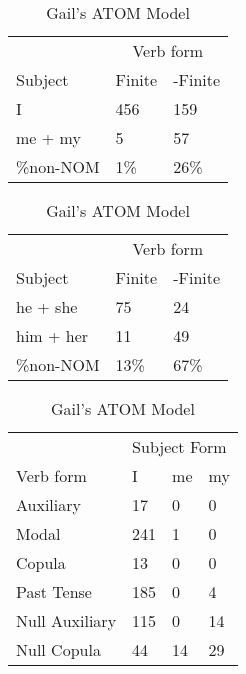 \begin{table}[]
    \caption{Gail's ATOM Model}
    \begin{minipage}{0.5\textwidth}
    \centering
    \begin{tabular}{@{}lll@{}}
        \toprule
         &\multicolumn{2}{c}{Verb form}\\
         \cline{2-3}
        Subject & Finite & -Finite \\
        \midrule
        I & 456 & 159 \\
        me + my & 5 & 57 \\
        \hline
        \%non-NOM & 1\% & 26\% \\
        \bottomrule
    \end{tabular}
\end{minipage}
\begin{minipage}{0.5\textwidth}
    \centering
    \begin{tabular}{@{}lll@{}}
        \toprule
         &\multicolumn{2}{c}{Verb form}\\
         \cline{2-3}
        Subject & Finite & -Finite \\
        \midrule
        he + she & 75 & 24 \\
        him + her & 11 & 49 \\
        \hline
        \%non-NOM & 13\% & 67\% \\
        \bottomrule
    \end{tabular}
    \end{minipage}
    \begin{minipage}{0.5\textwidth}
    \centering
    \begin{tabular}{@{}llll@{}}
        \toprule
            &\multicolumn{3}{l}{Subject Form}\\
            \cline{2-4}
        Verb form & I & me & my \\
        \midrule
        Auxiliary & 17 & 0 & 0 \\
        Modal & 241 & 1 & 0 \\
        Copula & 13 & 0 & 0 \\
        Past Tense & 185 & 0 & 4 \\
        \hline
        Null Auxiliary & 115 & 0 & 14 \\
        Null Copula & 44 & 14 & 29 \\
        \bottomrule
    \end{tabular}

\end{minipage}
\end{table}
